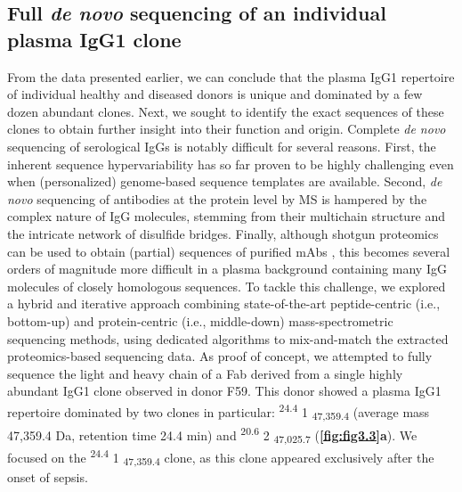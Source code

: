 \subsection{Full \emph{de novo} sequencing of an individual plasma IgG1 clone}
From the data presented earlier, we can conclude that the plasma IgG1 repertoire of individual healthy and diseased donors is unique and dominated by a few dozen abundant clones. Next, we sought to identify the exact sequences of these clones to obtain further insight into their function and origin. Complete \emph{de novo} sequencing of serological IgGs is notably difficult for several reasons. First, the inherent sequence hypervariability has so far proven to be highly challenging even when (personalized) genome-based sequence templates are available. Second, \emph{de novo} sequencing of antibodies at the protein level by MS is hampered by the complex nature of IgG molecules, stemming from their multichain structure and the intricate network of disulfide bridges. Finally, although shotgun proteomics can be used to obtain (partial) sequences of purified mAbs \cite{guthals2017de, sen2017automated, tran2016complete}, this becomes several orders of magnitude more difficult in a plasma background containing many IgG molecules of closely homologous sequences.
To tackle this challenge, we explored a hybrid and iterative approach combining state-of-the-art peptide-centric (i.e., bottom-up) and protein-centric (i.e., middle-down) mass-spectrometric sequencing methods, using dedicated algorithms to mix-and-match the extracted proteomics-based sequencing data. As proof of concept, we attempted to fully sequence the light and heavy chain of a Fab derived from a single highly abundant IgG1 clone observed in donor F59. This donor showed a plasma IgG1 repertoire dominated by two clones in particular: \textsuperscript{24.4} 1 \textsubscript{47,359.4} (average mass 47,359.4 Da, retention time 24.4 min) and \textsuperscript{20.6} 2 \textsubscript{47,025.7} (\textbf{\autoref{fig:fig3.3}a}). We focused on the \textsuperscript{24.4} 1 \textsubscript{47,359.4} clone, as this clone appeared exclusively after the onset of sepsis.

